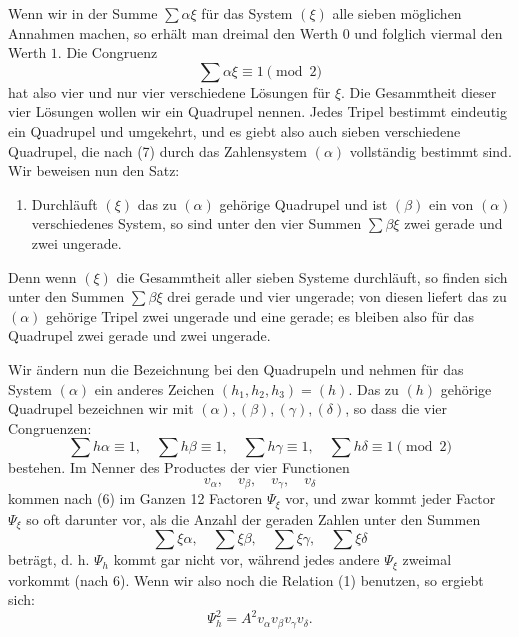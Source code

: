 \documentclass[11pt]{article}
\begin{document}
Wenn wir in der Summe $\sum\alpha\xi$ für das System $(\xi)$ alle sieben möglichen Annahmen machen, so erhält man dreimal den Werth $0$ und folglich viermal den Werth $1$. Die Congruenz
\begin{equation}
 \sum\alpha\xi\equiv 1\pmod 2
 \tag{7}
\end{equation}
hat also vier und nur vier verschiedene Lösungen für $\xi$. Die Gesammtheit dieser vier Lösungen wollen wir ein Quadrupel nennen. Jedes Tripel bestimmt eindeutig ein Quadrupel und umgekehrt, und es giebt also auch sieben verschiedene Quadrupel, die nach (7) durch das Zahlensystem $(\alpha)$ vollständig bestimmt sind. Wir beweisen nun den Satz:
\begin{enumerate}[label=\arabic*.,leftmargin=2.8em,start=6]
\item Durchläuft $(\xi)$ das zu $(\alpha)$ gehörige Quadrupel und ist $(\beta)$ ein von $(\alpha)$ verschiedenes System, so sind unter den vier Summen $\sum\beta\xi$ zwei gerade und zwei ungerade.
\end{enumerate}
Denn wenn $(\xi)$ die Gesammtheit aller sieben Systeme durchläuft, so finden sich unter den Summen $\sum\beta\xi$ drei gerade und vier ungerade; von diesen liefert das zu $(\alpha)$ gehörige Tripel zwei ungerade und eine gerade; es bleiben also für das Quadrupel zwei gerade und zwei ungerade.

Wir ändern nun die Bezeichnung bei den Quadrupeln und nehmen für das System $(\alpha)$ ein anderes Zeichen $(h_1,h_2,h_3)=(h)$. Das zu $(h)$ gehörige Quadrupel bezeichnen wir mit $(\alpha),(\beta),(\gamma),(\delta)$, so dass die vier Congruenzen:
\begin{equation}
 \sum h\alpha\equiv1,
 \quad \sum h\beta\equiv1,
 \quad \sum h\gamma\equiv1,
 \quad \sum h\delta\equiv1\pmod 2
 \tag{8}
\end{equation}
bestehen. Im Nenner des Productes der vier Functionen
\[
 v_\alpha,
 \quad v_\beta,
 \quad v_\gamma,
 \quad v_\delta
\]
kommen nach (6) im Ganzen 12 Factoren $\Psi_\xi$ vor, und zwar kommt jeder Factor $\Psi_\xi$ so oft darunter vor, als die Anzahl der geraden Zahlen unter den Summen
\[
 \sum\xi\alpha,
 \quad \sum\xi\beta,
 \quad \sum\xi\gamma,
 \quad \sum\xi\delta
\]
beträgt, d. h. $\Psi_h$ kommt gar nicht vor, während jedes andere $\Psi_\xi$ zweimal vorkommt (nach 6). Wenn wir also noch die Relation (1) benutzen, so ergiebt sich:
\begin{equation}
 \Psi_h^2=A^2v_\alpha v_\beta v_\gamma v_\delta.
 \tag{9}
\end{equation}
\end{document}
